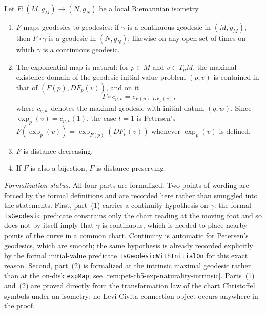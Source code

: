 \begin{proposition}
  \label{prop:pet-ch5-local-isometry-properties}
  \leanok
  Let $F:(M,g_M)\to(N,g_N)$ be a local Riemannian isometry.
  \begin{enumerate}
  \item[(1)] $F$ maps geodesics to geodesics: if $\gamma$ is a continuous geodesic
  in $(M,g_M)$, then $F\circ\gamma$ is a geodesic in $(N,g_N)$; likewise on any
  open set of times on which $\gamma$ is a continuous geodesic.
  \item[(2)] The exponential map is natural: for $p\in M$ and $v\in T_pM$, the
  maximal existence domain of the geodesic initial-value problem $(p,v)$ is
  contained in that of $(F(p),DF_p(v))$, and on it
  \[
    F\circ c_{p,v}=c_{F(p),DF_p(v)},
  \]
  where $c_{q,w}$ denotes the maximal geodesic with initial datum $(q,w)$. Since
  $\exp_p(v)=c_{p,v}(1)$, the case $t=1$ is Petersen's
  $F(\exp_p(v))=\exp_{F(p)}(DF_p(v))$ whenever $\exp_p(v)$ is defined.
  \item[(3)] $F$ is distance decreasing.
  \item[(4)] If $F$ is also a bijection, $F$ is distance preserving.
  \end{enumerate}

  \emph{Formalization status.} All four parts are formalized. Two points of
  wording are forced by the formal definitions and are recorded here rather than
  smuggled into the statements. First, part~(1) carries a continuity hypothesis on
  $\gamma$: the formal \texttt{IsGeodesic} predicate constrains only the chart
  reading at the moving foot and so does not by itself imply that $\gamma$ is
  continuous, which is needed to place nearby points of the curve in a common
  chart. Continuity is automatic for Petersen's geodesics, which are smooth; the
  same hypothesis is already recorded explicitly by the formal
  initial-value predicate \texttt{IsGeodesicWithInitialOn} for this exact reason.
  Second, part~(2) is formalized at the intrinsic maximal geodesic rather than at
  the on-disk \texttt{expMap}; see
  \cref{rem:pet-ch5-exp-naturality-intrinsic}. Parts~(1) and~(2) are proved
  directly from the transformation law of the chart Christoffel symbols under an
  isometry; no Levi-Civita connection object occurs anywhere in the proof.
\end{proposition}
